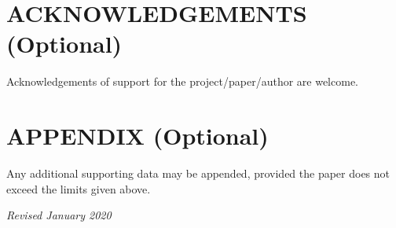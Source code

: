 \documentclass{isprs} %
\begin{document}
\section*{ACKNOWLEDGEMENTS (Optional)}\label{ACKNOWLEDGEMENTS}
Acknowledgements of support for the project/paper/author are welcome. 

{
	\begin{spacing}{1.17}
		\normalsize
	\end{spacing}
}


\section*{APPENDIX (Optional)}\label{APPENDIX}

Any additional supporting data may be appended, provided the paper does not exceed the limits given above. 

\vspace{1cm}
\textit{Revised January 2020}
\end{document}
